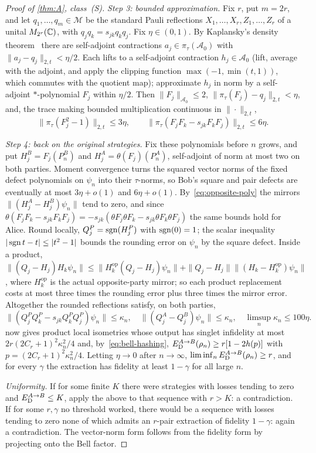 \begin{proof}[Proof of \cref{thm:A}, class~(S)]
\emph{Step 3: bounded approximation.} Fix $r$, put $m=2r$, and let $q_1,\dots,q_m\in\mathcal M$ be the standard Pauli
reflections $X_1,\dots,X_r,Z_1,\dots,Z_r$ of a unital $M_{2^r}(\mathbb C)$, with $q_jq_k=s_{jk}q_kq_j$. Fix $\eta\in(0,1)$. By
Kaplansky's density theorem~\cite{Kap51} there are self-adjoint contractions $a_j\in\pi_\tau(\mathcal A_0)$ with
$\|a_j-q_j\|_{2,t}<\eta/2$. Each lifts to a self-adjoint contraction $h_j\in\mathcal A_0$ (lift, average with the adjoint,
and apply the clipping function $\max(-1,\min(t,1))$, which commutes with the quotient map); approximate $h_j$ in norm by a
self-adjoint $*$-polynomial $F_j$ within $\eta/2$. Then $\|F_j\|_{\mathcal A_0}\le2$, $\|\pi_\tau(F_j)-q_j\|_{2,t}<\eta$, and,
the trace making bounded multiplication continuous in $\|\cdot\|_{2,t}$,
\begin{equation}\label{eq:A-limit}
\|\pi_\tau(F_j^2-1)\|_{2,t}\le3\eta,\qquad\|\pi_\tau(F_jF_k-s_{jk}F_kF_j)\|_{2,t}\le6\eta .
\end{equation}

\emph{Step 4: back on the original strategies.} Fix these polynomials before $n$ grows, and put $H^B_j=F_j(P^B_n)$ and
$H^A_j=\theta(F_j)(P^A_n)$, self-adjoint of norm at most two on both parties. Moment convergence turns the squared vector
norms of the fixed defect polynomials on $\psi_n$ into their $\tau$-norms, so Bob's square and pair defects are eventually
at most $3\eta+o(1)$ and $6\eta+o(1)$. By~\eqref{eq:opposite-poly} the mirrors $\|(H^A_j-H^B_j)\psi_n\|$ tend to zero, and
since $\theta(F_jF_k-s_{jk}F_kF_j)=-s_{jk}(\theta F_j\theta F_k-s_{jk}\theta F_k\theta F_j)$ the same bounds hold for Alice.
Round locally, $Q^P_j=\operatorname{sgn}(H^P_j)$ with $\operatorname{sgn}(0)=1$; the scalar inequality $|\operatorname{sgn} t-t|\le|t^2-1|$ bounds the rounding error
on $\psi_n$ by the square defect. Inside a product, $\|(Q_j-H_j)H_k\psi_n\|\le\|H_k^{\mathrm{op}}(Q_j-H_j)\psi_n\|+\|Q_j-H_j\|
\|(H_k-H_k^{\mathrm{op}})\psi_n\|$, where $H_k^{\mathrm{op}}$ is the actual opposite-party mirror; so each product
replacement costs at most three times the rounding error plus three times the mirror error. Altogether the rounded
reflections satisfy, on both parties,
\[
\|(Q^P_jQ^P_k-s_{jk}Q^P_kQ^P_j)\psi_n\|\le\kappa_n,\quad\|(Q^A_j-Q^B_j)\psi_n\|\le\kappa_n,\quad
\limsup_n\kappa_n\le100\eta .
\]
 now gives product local isometries whose output has singlet infidelity at most
$2r(2C_r+1)^2\kappa_n^2/4$ and, by~\eqref{eq:bell-hashing}, $E_{\mathrm D}^{A\to B}(\rho_n)\ge r[1-2h(p)]$ with
$p=(2C_r+1)^2\kappa_n^2/4$. Letting $\eta\to0$ after $n\to\infty$, $\liminf_nE_{\mathrm D}^{A\to B}(\rho_n)\ge r$, and for every
$\gamma$ the extraction has fidelity at least $1-\gamma$ for all large $n$.

\emph{Uniformity.} If for some finite $K$ there were strategies with losses tending to zero and $E_{\mathrm D}^{A\to B}\le K$, apply
the above to that sequence with $r>K$: a contradiction. If for some $r,\gamma$ no threshold worked, there would be a
sequence with losses tending to zero none of which admits an $r$-pair extraction of fidelity $1-\gamma$: again a
contradiction. The vector-norm form follows from the fidelity form by projecting onto the Bell factor.
\end{proof}

